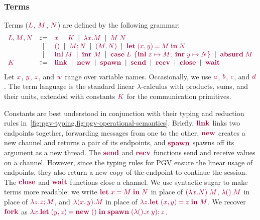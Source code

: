 \documentclass[main.tex]{subfiles}
\begin{document}
\subsubsection*{Terms}
Terms ($\tm{L}$, $\tm{M}$, $\tm{N}$) are defined by the following grammar:
\[
\begin{array}{lcl}
  \tm{L}, \tm{M}, \tm{N}
  & \Coloneqq & \tm{x}
    \sep        \tm{K}
    \sep        \tm{\lambda x.M}
    \sep        \tm{M\;N} \\
  & \sep      & \tm{\unit}
    \sep        \tm{\andthen{M}{N}}
    \sep        \tm{\pair{M}{N}}
    \sep        \tm{\letpair{x}{y}{M}{N}} \\
  & \sep      & \tm{\inl{M}}
    \sep        \tm{\inr{M}}
    \sep        \tm{\casesum{L}{x}{M}{y}{N}}
    \sep        \tm{\absurd{M}} \\
  \tm{K}
  & \Coloneqq & \tm{\link}
    \sep        \tm{\new}
    \sep        \tm{\spawn}
    \sep        \tm{\send}
    \sep        \tm{\recv}
    \sep        \tm{\close}
    \sep        \tm{\wait}
\end{array}
\]
Let $\tm{x}$, $\tm{y}$, $\tm{z}$, and $\tm{w}$ range over variable names. Occasionally, we use $\tm{a}$, $\tm{b}$, $\tm{c}$, and $\tm{d}$. The term language is the standard linear $\lambda$-calculus with products, sums, and their units, extended with constants $\tm{K}$ for the communication primitives.

Constants are best understood in conjunction with their typing and reduction rules in~\cref{fig:pgv-typing,fig:pgv-operational-semantics}.
Briefly, $\tm{\link}$ links two endpoints together, forwarding messages from one to the other, $\tm{\new}$ creates a new channel and returns a pair of its endpoints, and $\tm{\spawn}$ spawns off its argument as a new thread.
The $\tm{\send}$ and $\tm{\recv}$ functions send and receive values on a channel.
However, since the typing rules for PGV ensure the linear usage of endpoints, they also return a new copy of the endpoint to continue the session.
The $\tm{\close}$ and $\tm{\wait}$ functions close a channel.
We use syntactic sugar to make terms more readable: we write $\tm{\letbind{x}{M}{N}}$ in place of $\tm{(\lambda x.N)\;M}$, $\tm{\lambda\unit.M}$ in place of $\tm{\lambda z.\andthen{z}{M}}$, and $\tm{\lambda\pair{x}{y}.M}$ in place of $\tm{\lambda z.\letpair{x}{y}{z}{M}}$.
We recover $\tm{\fork}$ as $\tm{\lambda x.\letpair{y}{z}{\new\;\unit}{\andthen{\spawn\;{(\lambda\unit.x\;y)}}{z}}}$.
\end{document}
